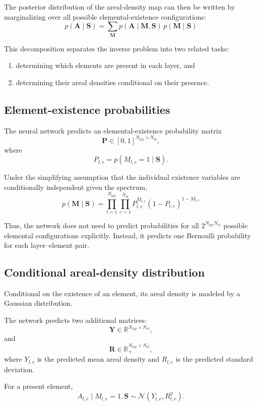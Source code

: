 \documentclass[11pt,a4paper]{article}
\begin{document}
The posterior distribution of the areal-density map can then be written by marginalizing over all possible elemental-existence configurations:
\[
\boxed{
p(\bm{A}\mid\bm{S})
=
\sum_{\bm{M}}
p(\bm{A}\mid\bm{M},\bm{S})\,
p(\bm{M}\mid\bm{S})
}
\label{eq:posterior_decomposition}
\]

This decomposition separates the inverse problem into two related tasks:
\begin{enumerate}
    \item determining which elements are present in each layer, and
    \item determining their areal densities conditional on their presence.
\end{enumerate}

\subsection{Element-existence probabilities}

The neural network predicts an elemental-existence probability matrix
\[
\bm{P}
\in
[0,1]^{N_{\mathrm{lay}}\times N_{\mathrm{el}}},
\]
where
\[
P_{l,e}
=
p(M_{l,e}=1\mid\bm{S}).
\]

Under the simplifying assumption that the individual existence variables are conditionally independent given the spectrum,
\[
\boxed{
p(\bm{M}\mid\bm{S})
=
\prod_{l=1}^{N_{\mathrm{lay}}}
\prod_{e=1}^{N_{\mathrm{el}}}
P_{l,e}^{M_{l,e}}
(1-P_{l,e})^{1-M_{l,e}}
}
\label{eq:mask_probability}
\]

Thus, the network does not need to predict probabilities for all
$2^{N_{\mathrm{lay}}N_{\mathrm{el}}}$ possible elemental configurations explicitly.
Instead, it predicts one Bernoulli probability for each layer--element pair.

\subsection{Conditional areal-density distribution}

Conditional on the existence of an element, its areal density is modeled by a Gaussian distribution.

The network predicts two additional matrices:
\[
\bm{Y}
\in
\mathbb{R}^{N_{\mathrm{lay}}\times N_{\mathrm{el}}},
\]
and
\[
\bm{R}
\in
\mathbb{R}_{+}^{N_{\mathrm{lay}}\times N_{\mathrm{el}}},
\]
where $Y_{l,e}$ is the predicted mean areal density and $R_{l,e}$ is the predicted standard deviation.

For a present element,
\[
A_{l,e}\mid M_{l,e}=1,\bm{S}
\sim
\mathcal{N}
\left(
Y_{l,e},
R_{l,e}^{2}
\right).
\]
\end{document}
